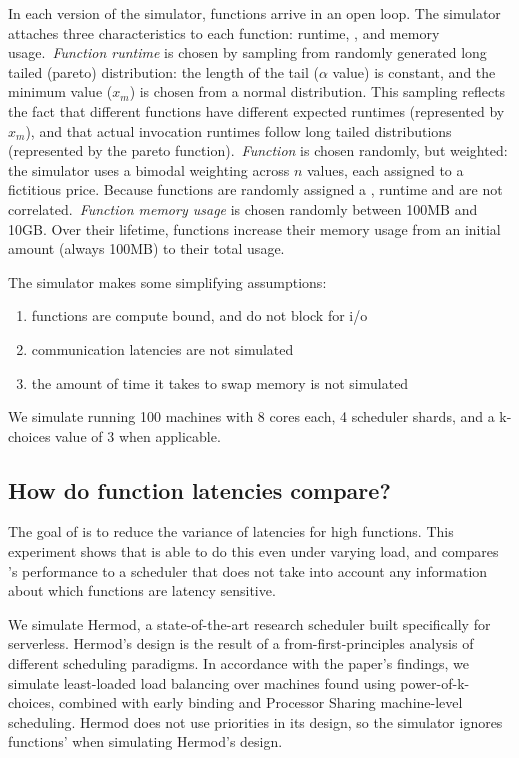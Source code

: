 In each version of the simulator, functions arrive in an open loop. The
simulator attaches three characteristics to each function: runtime,
\priceclass{}, and memory usage.~\textit{Function runtime} is chosen by sampling
from randomly generated long tailed (pareto) distribution: the length of the
tail ($\alpha$ value) is constant, and the minimum value ($x_m$) is chosen from
a normal distribution. This sampling reflects the fact that different functions
have different expected runtimes (represented by $x_m$), and that actual
invocation runtimes follow long tailed distributions (represented by the pareto
function).~\textit{Function \class{}} is chosen randomly, but weighted: the
simulator uses a bimodal weighting across $n$ \priceclass{} values, each
assigned to a fictitious price. Because functions are randomly assigned a
\class{}, runtime and \class{} are not correlated.~\textit{Function memory
usage} is chosen randomly between 100MB and 10GB. Over their lifetime, functions
increase their memory usage from an initial amount (always 100MB) to their total
usage.

The simulator makes some simplifying assumptions:
\begin{enumerate}
    \item functions are compute bound, and do not block for i/o
    \item communication latencies are not simulated
    \item the amount of time it takes to swap memory is not simulated
\end{enumerate}

We simulate running 100 machines with 8 cores each, 4 scheduler shards, and a
k-choices value of 3 when applicable.

\subsection{How do function latencies compare?}

The goal of \sys{} is to reduce the variance of latencies for high \priceclass{}
functions. This experiment shows that \sys{} is able to do this even under
varying load, and compares \sys{}'s performance to a scheduler that does not
take into account any information about which functions are latency sensitive.

We simulate Hermod\cite{hermod}, a state-of-the-art research scheduler built
specifically for serverless. Hermod's design is the result of a
from-first-principles analysis of different scheduling paradigms. In accordance
with the paper's findings, we simulate least-loaded load balancing over machines
found using power-of-k-choices, combined with early binding and Processor
Sharing machine-level scheduling. Hermod does not use priorities in its design,
so the simulator ignores functions' \class{} when simulating Hermod's design.

